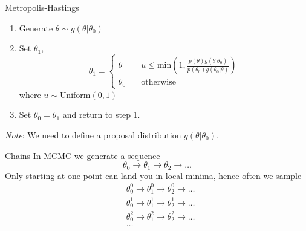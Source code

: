 \documentclass[
aspectratio=169,
14pt,
professionalfonts
]{beamer}
\begin{document}
\begin{frame}{Metropolis-Hastings}

\begin{enumerate}
    \item Generate $\theta \sim g(\theta|\theta_0)$
    \item Set $\theta_1$,
    \begin{equation*}
        \theta_1 =
        \begin{cases}
            \theta  &\quad u \leq \text{min}\left(1, \frac{p(\theta)g(\theta|\theta_0)}{p(\theta_0)g(\theta_0|\theta)}\right)\\
            \theta_0 &\quad \text{otherwise}
        \end{cases}
    \end{equation*}
    where $u \sim \text{Uniform}(0, 1)$
    \item Set  $\theta_0 = \theta_1$ and return to step 1.
\end{enumerate}
\textit{Note}: We need to define a proposal distribution $g(\theta|\theta_0)$.
\end{frame}

\begin{frame}{Chains}
    In MCMC we generate a sequence
    $$
    \theta_0 \to \theta_1 \to \theta_2 \to \ldots
    $$
    Only starting at one point can land you in local minima, hence often we sample
    \begin{align*}
        &\theta_0^0 \to \theta_1^0 \to \theta_2^0 \to \ldots \\
        &\theta_0^1 \to \theta_1^1 \to \theta_2^1 \to \ldots \\
        &\theta_0^2 \to \theta_1^2 \to \theta_2^2 \to \ldots \\
        &\ldots
    \end{align*}
\end{frame}
\end{document}
